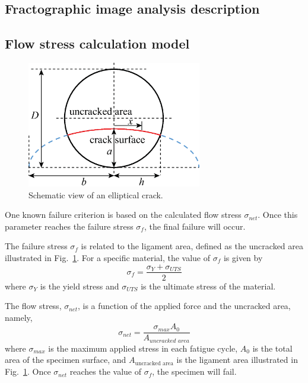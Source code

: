 \documentclass[preprint,12pt]{elsarticle}
\begin{document}
\subsection{Fractographic image analysis description}
\label{Subsec: Fractographic image analysis}

\subsection{Flow stress calculation model}
\label{Subsec: Flow stress calculation model}
\begin{figure}[t!]
  \begin{center}
  \includegraphics[width=3in]{elliptical_surface_crack.eps}
  \caption{Schematic view of an elliptical crack.}
  \label{fig:elliptical_crack}
   \end{center}
\end{figure}

One known failure criterion is based on the calculated flow stress $\sigma_{net}$. Once this parameter reaches the failure stress $\sigma_{f}$, the final failure will occur.

The failure stress \(\sigma_{f}\) is related to the ligament area, defined as the uncracked area illustrated in Fig.~\ref{fig:elliptical_crack}. For a specific material, the value of \(\sigma_{f}\) is given by \cite{kanchanomai2004low}
%
\begin{equation}
    \sigma_{f} = \frac{\sigma_Y + \sigma_{UTS}}{2}
\end{equation}
%
where \(\sigma_Y\) is the yield stress and \(\sigma_{UTS}\) is the ultimate stress of the material.

The flow stress, \(\sigma_{net}\), is a function of the applied force and the uncracked area, namely,
%
\begin{equation}
\label{eq:sig_net}
\sigma_{net}= \displaystyle\frac{\sigma_{max} A_0}{A_{\textit{uncracked area}}}
\end{equation}
%
where $\sigma_{max}$ is the maximum applied stress in each fatigue cycle, \(A_0\) is the total area of the specimen surface, and \(A_{\text{uncracked area}}\) is the ligament area illustrated in Fig.~\ref{fig:elliptical_crack}. Once \(\sigma_{net}\) reaches the value of \(\sigma_f\), the specimen will fail.
%
%
\end{document}
